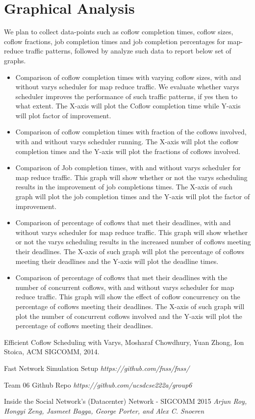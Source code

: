 \documentclass{article}
\begin{document}
\section{Graphical Analysis}
We plan to collect data-points such as coflow completion times, coflow sizes, coflow fractions, job completion times and job completion percentages for map-reduce traffic patterns, followed by analyze such data to report below set of graphs.
\begin{itemize}
\item Comparison of coflow completion times with varying coflow sizes, with and without varys scheduler for map reduce traffic. We evaluate whether varys scheduler improves the performance of such traffic patterns, if yes then to what extent. The X-axis will plot the Coflow completion time while Y-axis will plot factor of improvement.
\item Comparison of coflow completion times with fraction of the coflows involved, with and without varys scheduler running. The X-axis will plot the coflow completion times and the Y-axis will plot the fractions of coflows involved.
\item Comparison of Job completion times, with and without varys scheduler for map reduce traffic. This graph will show whether or not the varys scheduling results in the improvement of job completions times. The X-axis of such graph will plot the job completion times and the Y-axis will plot the factor of improvement.
\item Comparison of percentage of coflows that met their deadlines, with and without varys scheduler for map reduce traffic. This graph will show whether or not the varys scheduling results in the increased number of coflows meeting their deadlines. The X-axis of such graph will plot the percentage of coflows meeting their deadlines and the Y-axis will plot the deadline times.
\item Comparison of percentage of coflows that met their deadlines with the number of concurrent coflows, with and without varys scheduler for map reduce traffic. This graph will show the effect of coflow concurrency on the percentage of coflows meeting their deadlines. The X-axis of such graph will plot the number of concurrent coflows involved and the Y-axis will plot the percentage of coflows meeting their deadlines.
\end{itemize}



\begin{thebibliography}{10}
Efficient Coflow Scheduling with Varys, Mosharaf Chowdhury, Yuan Zhong, Ion Stoica, ACM SIGCOMM, 2014.

Fast Network Simulation Setup \textit{https://github.com/fnss/fnss/}

Team 06 Github Repo \textit{https://github.com/ucsdcse222a/group6}

Inside the Social Network’s (Datacenter) Network - SIGCOMM 2015
\textit{Arjun Roy, Hongyi Zeng, Jasmeet Bagga, George Porter, and Alex C. Snoeren}

\end{thebibliography}
\end{document}
